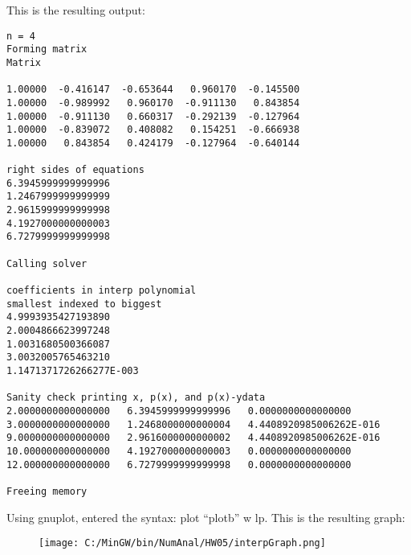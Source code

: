 \documentclass[12pt]{article}
\begin{document}
This is the resulting output:

\begin{verbatim}
n = 4
Forming matrix
Matrix

1.00000  -0.416147  -0.653644   0.960170  -0.145500
1.00000  -0.989992   0.960170  -0.911130   0.843854
1.00000  -0.911130   0.660317  -0.292139  -0.127964
1.00000  -0.839072   0.408082   0.154251  -0.666938
1.00000   0.843854   0.424179  -0.127964  -0.640144

right sides of equations
6.3945999999999996
1.2467999999999999
2.9615999999999998
4.1927000000000003
6.7279999999999998

Calling solver

coefficients in interp polynomial
smallest indexed to biggest
4.9993935427193890
2.0004866623997248
1.0031680500366087
3.0032005765463210
1.1471371726266277E-003

Sanity check printing x, p(x), and p(x)-ydata
2.0000000000000000   6.3945999999999996   0.0000000000000000
3.0000000000000000   1.2468000000000004   4.4408920985006262E-016
9.0000000000000000   2.9616000000000002   4.4408920985006262E-016
10.000000000000000   4.1927000000000003   0.0000000000000000
12.000000000000000   6.7279999999999998   0.0000000000000000

Freeing memory
\end{verbatim}

Using gnuplot, entered the syntax: plot ``plotb'' w lp. This is the resulting graph:

\begin{figure}
	\centering
		\texttt{[image: C:/MinGW/bin/NumAnal/HW05/interpGraph.png]}
	\label{fig:interpGraph}
\end{figure}
\end{document}
